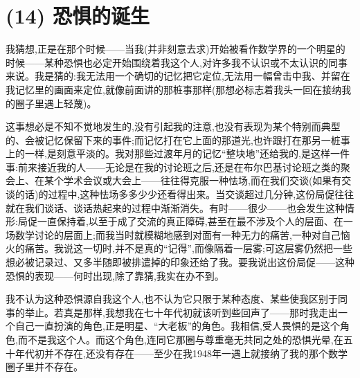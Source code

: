 \section{(14) 恐惧的诞生}

我猜想,正是在那个时候——当我(并非刻意去求)开始被看作数学界的一个明星的时候——某种恐惧也必定开始围绕着我这个人,对许多我不认识或不太认识的同事来说。我是猜的:我无法用一个确切的记忆把它定位,无法用一幅曾击中我、并留在我记忆里的画面来定位,就像前面讲的那桩事那样(那想必标志着我头一回在接纳我的圈子里遇上轻蔑)。

这事想必是不知不觉地发生的,没有引起我的注意,也没有表现为某个特别而典型的、会被记忆保留下来的事件;而记忆打在它上面的那道光,也许跟打在那另一桩事上的一样,是刻意平淡的。我对那些过渡年月的记忆“整块地”还给我的,是这样一件事:前来接近我的人——无论是在我的讨论班之后,还是在布尔巴基讨论班之类的聚会上、在某个学术会议或大会上——往往得克服一种怯场,而在我们交谈(如果有交谈的话)的过程中,这种怯场多多少少还看得出来。当交谈超过几分钟,这份局促往往就在我们谈话、谈话热起来的过程中渐渐消失。有时——很少——也会发生这种情形:局促一直保持着,以至于成了交流的真正障碍,甚至在最不涉及个人的层面、在一场数学讨论的层面上;而我当时就模糊地感到对面有一种无力的痛苦,一种对自己恼火的痛苦。我说这一切时,并不是真的“记得”,而像隔着一层雾;可这层雾仍然把一些想必被记录过、又多半随即被排遣掉的印象还给了我。要我说出这份局促——这种恐惧的表现——何时出现,除了靠猜,我实在办不到。

我不认为这种恐惧源自我这个人,也不认为它只限于某种态度、某些使我区别于同事的举止。若真是那样,我想我在七十年代初就该听到些回声了——那时我走出一个自己一直扮演的角色,正是明星、“大老板”的角色。我相信,受人畏惧的是这个角色,而不是我这个人。而这个角色,连同它那圈与尊重毫无共同之处的恐惧光晕,在五十年代初并不存在,还没有存在——至少在我1948年一遇上就接纳了我的那个数学圈子里并不存在。

